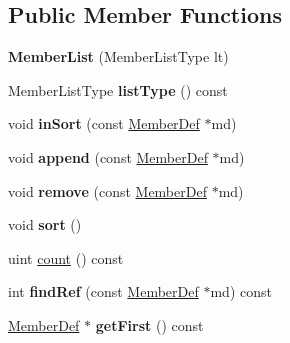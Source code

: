\subsection*{Public Member Functions}
\begin{DoxyCompactItemize}
\item 
\mbox{\label{class_member_list_af8be5bea0593d2e019634085089bac31}} 
{\bfseries Member\+List} (Member\+List\+Type lt)
\item 
\mbox{\label{class_member_list_aa31a7d651481862036f72381f7e2a96d}} 
Member\+List\+Type {\bfseries list\+Type} () const
\item 
\mbox{\label{class_member_list_a43a217557a9253b279022b788fc4bb72}} 
void {\bfseries in\+Sort} (const \mbox{\hyperlink{class_member_def}{Member\+Def}} $\ast$md)
\item 
\mbox{\label{class_member_list_aa85af958b0f7efe237d00565e219c672}} 
void {\bfseries append} (const \mbox{\hyperlink{class_member_def}{Member\+Def}} $\ast$md)
\item 
\mbox{\label{class_member_list_ae68d0b6607790d86ae994b2080d20f43}} 
void {\bfseries remove} (const \mbox{\hyperlink{class_member_def}{Member\+Def}} $\ast$md)
\item 
\mbox{\label{class_member_list_a4e79ac20b4835ae71ff1e7ceaa4a4080}} 
void {\bfseries sort} ()
\item 
uint \mbox{\hyperlink{class_member_list_a38422e3b6e288256a4e3375c90a0a4a4}{count}} () const
\item 
\mbox{\label{class_member_list_a1c1632c452c3a149a6d2e15ea85b57e2}} 
int {\bfseries find\+Ref} (const \mbox{\hyperlink{class_member_def}{Member\+Def}} $\ast$md) const
\item 
\mbox{\label{class_member_list_aaead333b2a595eff4e0d794bc7700755}} 
\mbox{\hyperlink{class_member_def}{Member\+Def}} $\ast$ {\bfseries get\+First} () const
\item 
\mbox{\label{class_member_list_a13e89fa267a3d5062ac09c90051d0028}} 

\end{DoxyCompactItemize}

